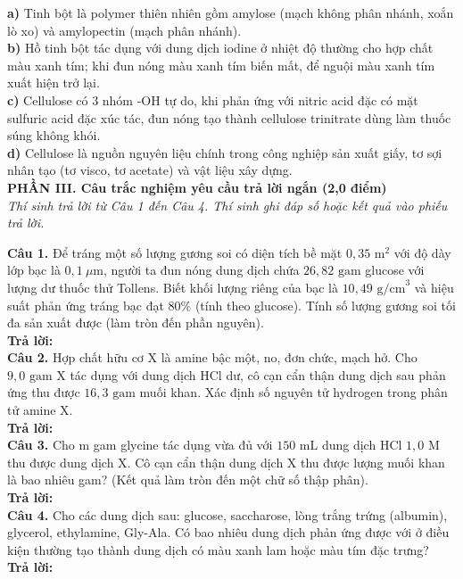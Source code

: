 \documentclass[11pt,a4paper]{article}
\begin{document}
\quad \textbf{a)} Tinh bột là polymer thiên nhiên gồm amylose (mạch không phân nhánh, xoắn lò xo) và amylopectin (mạch phân nhánh).\\[2pt]
\quad \textbf{b)} Hồ tinh bột tác dụng với dung dịch iodine ở nhiệt độ thường cho hợp chất màu xanh tím; khi đun nóng màu xanh tím biến mất, để nguội màu xanh tím xuất hiện trở lại.\\[2pt]
\quad \textbf{c)} Cellulose có 3 nhóm -OH tự do, khi phản ứng với nitric acid đặc có mặt sulfuric acid đặc xúc tác, đun nóng tạo thành cellulose trinitrate dùng làm thuốc súng không khói.\\[2pt]
\quad \textbf{d)} Cellulose là nguồn nguyên liệu chính trong công nghiệp sản xuất giấy, tơ sợi nhân tạo (tơ visco, tơ acetate) và vật liệu xây dựng.\\[2pt]

\vspace{4pt}
\noindent\textbf{\large\color{mainGreen}PHẦN III. Câu trắc nghiệm yêu cầu trả lời ngắn (2,0 điểm)}\\
\textit{Thí sinh trả lời từ Câu 1 đến Câu 4. Thí sinh ghi đáp số hoặc kết quả vào phiếu trả lời.}
\vspace{4pt}

\textbf{Câu 1.} Để tráng một số lượng gương soi có diện tích bề mặt $0,35\text{ m}^2$ với độ dày lớp bạc là $0,1\ \mu\text{m}$, người ta đun nóng dung dịch chứa $26,82\text{ gam}$ glucose với lượng dư thuốc thử Tollens. Biết khối lượng riêng của bạc là $10,49\text{ g/cm}^3$ và hiệu suất phản ứng tráng bạc đạt $80\%$ (tính theo glucose). Tính số lượng gương soi tối đa sản xuất được (làm tròn đến phần nguyên).\\[2pt]
\textbf{Trả lời:} \dotfill\\[4pt]
\vspace{2pt}
\textbf{Câu 2.} Hợp chất hữu cơ X là amine bậc một, no, đơn chức, mạch hở. Cho $9,0\text{ gam}$ X tác dụng với dung dịch HCl dư, cô cạn cẩn thận dung dịch sau phản ứng thu được $16,3\text{ gam}$ muối khan. Xác định số nguyên tử hydrogen trong phân tử amine X.\\[2pt]
\textbf{Trả lời:} \dotfill\\[4pt]
\vspace{2pt}
\textbf{Câu 3.} Cho m gam glycine tác dụng vừa đủ với $150\text{ mL}$ dung dịch HCl $1,0\text{ M}$ thu được dung dịch X. Cô cạn cẩn thận dung dịch X thu được lượng muối khan là bao nhiêu gam? (Kết quả làm tròn đến một chữ số thập phân).\\[2pt]
\textbf{Trả lời:} \dotfill\\[4pt]
\vspace{2pt}
\textbf{Câu 4.} Cho các dung dịch sau: glucose, saccharose, lòng trắng trứng (albumin), glycerol, ethylamine, Gly-Ala. Có bao nhiêu dung dịch phản ứng được với  ở điều kiện thường tạo thành dung dịch có màu xanh lam hoặc màu tím đặc trưng?\\[2pt]
\textbf{Trả lời:} \dotfill\\[4pt]
\vspace{2pt}
\end{document}
